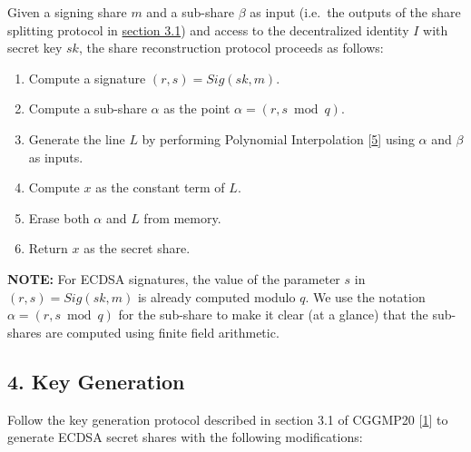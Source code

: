 \documentclass[
]{article}
\providecommand{\tightlist}{%
  \setlength{\itemsep}{0pt}\setlength{\parskip}{0pt}}
\begin{document}
Given a signing share \(m\) and a sub-share \(\beta\) as input (i.e.~the
outputs of the share splitting protocol in
\protect\hyperlink{share-splitting}{section 3.1}) and access to the
decentralized identity \(I\) with secret key \(sk\), the share
reconstruction protocol proceeds as follows:

\begin{enumerate}
\def\labelenumi{\arabic{enumi}.}
\tightlist
\item
  Compute a signature \((r, s) = Sig(sk, m)\).
\item
  Compute a sub-share \(\alpha\) as the point
  \(\alpha = (r, s \bmod q)\).
\item
  Generate the line \(L\) by performing Polynomial Interpolation
  {[}\protect\hyperlink{ref-wiki:interpolation}{5}{]} using \(\alpha\)
  and \(\beta\) as inputs.
\item
  Compute \(x\) as the constant term of \(L\).
\item
  Erase both \(\alpha\) and \(L\) from memory.
\item
  Return \(x\) as the secret share.
\end{enumerate}

\textbf{NOTE:} For ECDSA signatures, the value of the parameter \(s\) in
\((r, s) = Sig(sk, m)\) is already computed modulo \(q\). We use the
notation \(\alpha = (r, s \bmod q)\) for the sub-share to make it clear
(at a glance) that the sub-shares are computed using finite field
arithmetic.

\hypertarget{key-generation}{%
\subsection{4. Key Generation}\label{key-generation}}

Follow the key generation protocol described in section 3.1 of CGGMP20
{[}\protect\hyperlink{ref-cggmp20}{1}{]} to generate ECDSA secret shares
with the following modifications:
\end{document}
